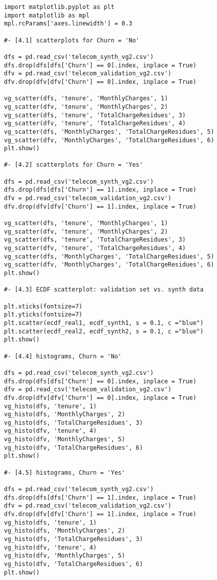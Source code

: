 \documentclass[oneside,10pt]{book}
\begin{document}
\begin{lstlisting}
import matplotlib.pyplot as plt
import matplotlib as mpl
mpl.rcParams['axes.linewidth'] = 0.3

#- [4.1] scatterplots for Churn = 'No'

dfs = pd.read_csv('telecom_synth_vg2.csv')
dfs.drop(dfs[dfs['Churn'] == 0].index, inplace = True)
dfv = pd.read_csv('telecom_validation_vg2.csv')
dfv.drop(dfv[dfv['Churn'] == 0].index, inplace = True)

vg_scatter(dfs, 'tenure', 'MonthlyCharges', 1)
vg_scatter(dfv, 'tenure', 'MonthlyCharges', 2)
vg_scatter(dfs, 'tenure', 'TotalChargeResidues', 3)
vg_scatter(dfv, 'tenure', 'TotalChargeResidues', 4)
vg_scatter(dfs, 'MonthlyCharges', 'TotalChargeResidues', 5)
vg_scatter(dfv, 'MonthlyCharges', 'TotalChargeResidues', 6)
plt.show()

#- [4.2] scatterplots for Churn = 'Yes'

dfs = pd.read_csv('telecom_synth_vg2.csv')
dfs.drop(dfs[dfs['Churn'] == 1].index, inplace = True)
dfv = pd.read_csv('telecom_validation_vg2.csv')
dfv.drop(dfv[dfv['Churn'] == 1].index, inplace = True)

vg_scatter(dfs, 'tenure', 'MonthlyCharges', 1)
vg_scatter(dfv, 'tenure', 'MonthlyCharges', 2)
vg_scatter(dfs, 'tenure', 'TotalChargeResidues', 3)
vg_scatter(dfv, 'tenure', 'TotalChargeResidues', 4)
vg_scatter(dfs, 'MonthlyCharges', 'TotalChargeResidues', 5)
vg_scatter(dfv, 'MonthlyCharges', 'TotalChargeResidues', 6)
plt.show()

#- [4.3] ECDF scatterplot: validation set vs. synth data 

plt.xticks(fontsize=7)
plt.yticks(fontsize=7)
plt.scatter(ecdf_real1, ecdf_synth1, s = 0.1, c ="blue")
plt.scatter(ecdf_real2, ecdf_synth2, s = 0.1, c ="blue")
plt.show()

#- [4.4] histograms, Churn = 'No'

dfs = pd.read_csv('telecom_synth_vg2.csv')
dfs.drop(dfs[dfs['Churn'] == 0].index, inplace = True)
dfv = pd.read_csv('telecom_validation_vg2.csv')
dfv.drop(dfv[dfv['Churn'] == 0].index, inplace = True)
vg_histo(dfs, 'tenure', 1)
vg_histo(dfs, 'MonthlyCharges', 2)
vg_histo(dfs, 'TotalChargeResidues', 3)
vg_histo(dfv, 'tenure', 4)
vg_histo(dfv, 'MonthlyCharges', 5)
vg_histo(dfv, 'TotalChargeResidues', 6)
plt.show()

#- [4.5] histograms, Churn = 'Yes'

dfs = pd.read_csv('telecom_synth_vg2.csv')
dfs.drop(dfs[dfs['Churn'] == 1].index, inplace = True)
dfv = pd.read_csv('telecom_validation_vg2.csv')
dfv.drop(dfv[dfv['Churn'] == 1].index, inplace = True)
vg_histo(dfs, 'tenure', 1)
vg_histo(dfs, 'MonthlyCharges', 2)
vg_histo(dfs, 'TotalChargeResidues', 3)
vg_histo(dfv, 'tenure', 4)
vg_histo(dfv, 'MonthlyCharges', 5)
vg_histo(dfv, 'TotalChargeResidues', 6)
plt.show()
\end{lstlisting}
\end{document}
